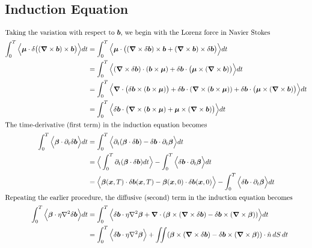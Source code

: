 \documentclass{article}
\renewcommand{\vec}[1]{\boldsymbol{#1}}
\newcommand{\grad}{\vec{\nabla}}
\newcommand{\laplacian}{\nabla^2}
\begin{document}
\newpage
\subsection*{Induction Equation}
\begin{align*}
    \intertext{Taking the variation with respect to $\vec{b}$, we begin with the Lorenz force in Navier Stokes}
    \int_0^T \Big\langle \vec{\mu}\cdot\delta \big( (\grad\times\vec{b})\times\vec{b} \big)\Big\rangle dt &= \int_0^T \Big\langle \vec{\mu}\cdot\big( (\grad\times\delta\vec{b})\times\vec{b} + (\grad\times\vec{b})\times\delta \vec{b} \big)\Big\rangle dt \\
    &= \int_0^T \Big\langle (\grad\times\delta\vec{b})\cdot(\vec{b}\times\vec{\mu}) + \delta\vec{b}\cdot\big( \vec{\mu}\times(\grad\times\vec{b}) \big)\Big\rangle dt \\
    &= \int_0^T \Big\langle \grad\cdot\big( \delta\vec{b}\times (\vec{b}\times\vec{\mu}) \big) +  \delta\vec{b}\cdot(\grad\times (\vec{b}\times\vec{\mu})) + \delta\vec{b}\cdot\big( \vec{\mu}\times(\grad\times\vec{b}) \big)\Big\rangle dt \\
    &= \int_0^T \Big\langle  \delta\vec{b}\cdot\big(\grad\times (\vec{b}\times\vec{\mu}) +  \vec{\mu}\times(\grad\times\vec{b}) \big)\Big\rangle dt \\
    \intertext{The time-derivative (first term) in the induction equation becomes}
    \int_0^T \Big\langle \vec{\beta} \cdot \partial_t\delta \vec{b} \Big\rangle dt &= \int_0^T \Big\langle \partial_t (\vec{\beta} \cdot \delta \vec{b}) - \delta \vec{b}\cdot\partial_t \vec{\beta} \Big\rangle dt\\
    &= \Big\langle\int_0^T \partial_t (\vec{\beta} \cdot \delta \vec{b}) dt \Big\rangle - \int_0^T \Big\langle \delta \vec{b}\cdot\partial_t \vec{\beta} \Big\rangle dt\\
    &= \Big\langle \vec{\beta}(\vec{x}, T) \cdot \delta \vec{b}(\vec{x}, T) - \vec{\beta}(\vec{x}, 0) \cdot \delta \vec{b}(\vec{x}, 0) \Big\rangle - \int_0^T \Big\langle \delta \vec{b}\cdot\partial_t \vec{\beta} \Big\rangle dt\\
    \intertext{Repeating the earlier procedure, the diffusive (second) term in the induction equation becomes}
    \int_0^T \Big\langle \vec{\beta} \cdot \eta\laplacian\delta\vec{b} \Big\rangle dt &= \int_0^T \Big\langle \delta\vec{b} \cdot \eta\laplacian\vec{\beta} + \grad\cdot(\vec{\beta}\times(\grad\times\delta\vec{b}) - \delta\vec{b}\times(\grad\times\vec{\beta})) \Big\rangle dt\\
    &= \int_0^T \Big\langle \delta\vec{b} \cdot \eta\laplacian\vec{\beta}\Big\rangle + \iint (\vec{\beta}\times(\grad\times\delta\vec{b}) - \delta\vec{b}\times(\grad\times\vec{\beta})) \cdot \hat{n}\, dS\, dt\\

\end{align*}
\end{document}
